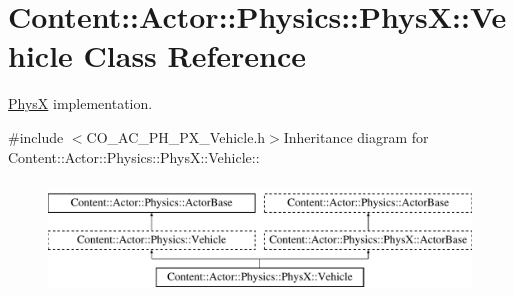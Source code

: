 \hypertarget{classContent_1_1Actor_1_1Physics_1_1PhysX_1_1Vehicle}{
\section{Content::Actor::Physics::PhysX::Vehicle Class Reference}
\label{classContent_1_1Actor_1_1Physics_1_1PhysX_1_1Vehicle}
}


\hyperlink{namespaceContent_1_1Actor_1_1Physics_1_1PhysX}{PhysX} implementation.  


{\ttfamily \#include $<$CO\_\-AC\_\-PH\_\-PX\_\-Vehicle.h$>$}Inheritance diagram for Content::Actor::Physics::PhysX::Vehicle::\begin{figure}[H]
\begin{center}
\leavevmode
\includegraphics[height=3cm]{classContent_1_1Actor_1_1Physics_1_1PhysX_1_1Vehicle}
\end{center}
\end{figure}
